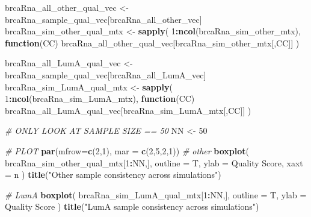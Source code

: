 \documentclass[
]{book}
\newenvironment{Shaded}{\begin{snugshade}}{\end{snugshade}}
\newcommand{\CommentTok}[1]{\textcolor[rgb]{0.56,0.35,0.01}{\textit{#1}}}
\newcommand{\ControlFlowTok}[1]{\textcolor[rgb]{0.13,0.29,0.53}{\textbf{#1}}}
\newcommand{\DataTypeTok}[1]{\textcolor[rgb]{0.13,0.29,0.53}{#1}}
\newcommand{\DecValTok}[1]{\textcolor[rgb]{0.00,0.00,0.81}{#1}}
\newcommand{\KeywordTok}[1]{\textcolor[rgb]{0.13,0.29,0.53}{\textbf{#1}}}
\newcommand{\NormalTok}[1]{#1}
\newcommand{\OperatorTok}[1]{\textcolor[rgb]{0.81,0.36,0.00}{\textbf{#1}}}
\newcommand{\StringTok}[1]{\textcolor[rgb]{0.31,0.60,0.02}{#1}}
\begin{document}
\begin{Shaded}
\begin{Highlighting}[]
\NormalTok{brcaRna\_all\_other\_qual\_vec <{-}}\StringTok{ }\NormalTok{brcaRna\_sample\_qual\_vec[brcaRna\_all\_other\_vec]}
\NormalTok{brcaRna\_sim\_other\_qual\_mtx <{-}}\StringTok{ }\KeywordTok{sapply}\NormalTok{(}
  \DecValTok{1}\OperatorTok{:}\KeywordTok{ncol}\NormalTok{(brcaRna\_sim\_other\_mtx), }
  \ControlFlowTok{function}\NormalTok{(CC) brcaRna\_all\_other\_qual\_vec[brcaRna\_sim\_other\_mtx[,CC]]}
\NormalTok{ )}

\NormalTok{brcaRna\_all\_LumA\_qual\_vec <{-}}\StringTok{ }\NormalTok{brcaRna\_sample\_qual\_vec[brcaRna\_all\_LumA\_vec]}
\NormalTok{brcaRna\_sim\_LumA\_qual\_mtx <{-}}\StringTok{ }\KeywordTok{sapply}\NormalTok{(}
  \DecValTok{1}\OperatorTok{:}\KeywordTok{ncol}\NormalTok{(brcaRna\_sim\_LumA\_mtx),  }
  \ControlFlowTok{function}\NormalTok{(CC) brcaRna\_all\_LumA\_qual\_vec[brcaRna\_sim\_LumA\_mtx[,CC]]}
\NormalTok{ )}

\CommentTok{\# ONLY LOOK AT SAMPLE SIZE == 50}
\NormalTok{NN <{-}}\StringTok{ }\DecValTok{50}

\CommentTok{\# PLOT}
\KeywordTok{par}\NormalTok{(}\DataTypeTok{mfrow=}\KeywordTok{c}\NormalTok{(}\DecValTok{2}\NormalTok{,}\DecValTok{1}\NormalTok{), }\DataTypeTok{mar =} \KeywordTok{c}\NormalTok{(}\DecValTok{2}\NormalTok{,}\DecValTok{5}\NormalTok{,}\DecValTok{2}\NormalTok{,}\DecValTok{1}\NormalTok{))}
\CommentTok{\# other}
\KeywordTok{boxplot}\NormalTok{(}
\NormalTok{  brcaRna\_sim\_other\_qual\_mtx[}\DecValTok{1}\OperatorTok{:}\NormalTok{NN,],}
  \DataTypeTok{outline =}\NormalTok{ T, }
  \DataTypeTok{ylab =} \StringTok{\textquotesingle{}Quality Score\textquotesingle{}}\NormalTok{,}
  \DataTypeTok{xaxt =} \StringTok{\textquotesingle{}n\textquotesingle{}}
\NormalTok{)}
\KeywordTok{title}\NormalTok{(}\StringTok{"Other sample consistency across simulations"}\NormalTok{)}

\CommentTok{\# LumA}
\KeywordTok{boxplot}\NormalTok{(}
\NormalTok{  brcaRna\_sim\_LumA\_qual\_mtx[}\DecValTok{1}\OperatorTok{:}\NormalTok{NN,],}
  \DataTypeTok{outline =}\NormalTok{ T, }
  \DataTypeTok{ylab =} \StringTok{\textquotesingle{}Quality Score\textquotesingle{}}
\NormalTok{)}
\KeywordTok{title}\NormalTok{(}\StringTok{"LumA sample consistency across simulations"}\NormalTok{)}
\end{Highlighting}
\end{Shaded}
\end{document}
